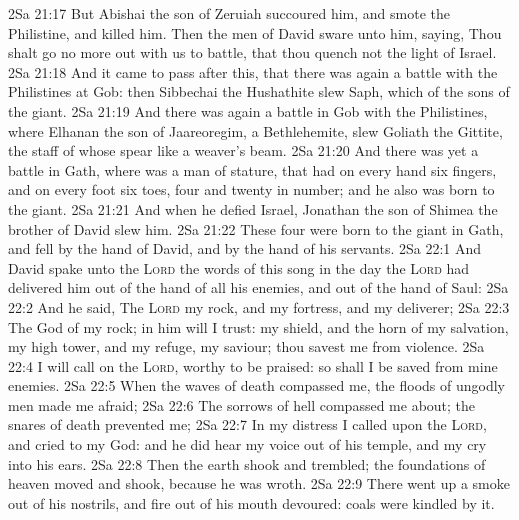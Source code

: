 \vs 2Sa 21:17 But Abishai the son of Zeruiah succoured him, and smote the Philistine, and killed him. Then the men of David sware unto him, saying, Thou shalt go no more out with us to battle, that thou quench not the light of Israel.
\vs 2Sa 21:18 And it came to pass after this, that there was again a battle with the Philistines at Gob: then Sibbechai the Hushathite slew Saph, which  of the sons of the giant.
\vs 2Sa 21:19 And there was again a battle in Gob with the Philistines, where Elhanan the son of Jaareoregim, a Bethlehemite, slew  Goliath the Gittite, the staff of whose spear  like a weaver's beam.
\vs 2Sa 21:20 And there was yet a battle in Gath, where was a man of  stature, that had on every hand six fingers, and on every foot six toes, four and twenty in number; and he also was born to the giant.
\vs 2Sa 21:21 And when he defied Israel, Jonathan the son of Shimea the brother of David slew him.
\vs 2Sa 21:22 These four were born to the giant in Gath, and fell by the hand of David, and by the hand of his servants.
\vs 2Sa 22:1 And David spake unto the \textsc{Lord} the words of this song in the day  the \textsc{Lord} had delivered him out of the hand of all his enemies, and out of the hand of Saul:
\vs 2Sa 22:2 And he said, The \textsc{Lord}  my rock, and my fortress, and my deliverer;
\vs 2Sa 22:3 The God of my rock; in him will I trust:  my shield, and the horn of my salvation, my high tower, and my refuge, my saviour; thou savest me from violence.
\vs 2Sa 22:4 I will call on the \textsc{Lord},  worthy to be praised: so shall I be saved from mine enemies.
\vs 2Sa 22:5 When the waves of death compassed me, the floods of ungodly men made me afraid;
\vs 2Sa 22:6 The sorrows of hell compassed me about; the snares of death prevented me;
\vs 2Sa 22:7 In my distress I called upon the \textsc{Lord}, and cried to my God: and he did hear my voice out of his temple, and my cry  into his ears.
\vs 2Sa 22:8 Then the earth shook and trembled; the foundations of heaven moved and shook, because he was wroth.
\vs 2Sa 22:9 There went up a smoke out of his nostrils, and fire out of his mouth devoured: coals were kindled by it.
